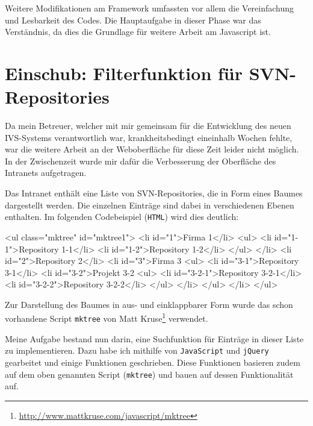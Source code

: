 \documentclass[xcolor=dvipsnames,11pt,paper=a4paper]{report}
\begin{document}
Weitere Modifikationen am Framework umfassten vor allem die Vereinfachung und Lesbarkeit
des Codes. Die Hauptaufgabe in dieser Phase war das Verständnis, da dies die Grundlage
für weitere Arbeit am Javascript ist.



\section{Einschub: Filterfunktion für SVN-Repositories}
\label{sec:svn}

Da mein Betreuer, welcher mit mir gemeinsam für die Entwicklung des neuen IVS-Systems
verantwortlich war, krankheitsbedingt eineinhalb Wochen fehlte, war die weitere
Arbeit an der Weboberfläche für diese Zeit leider nicht möglich. In der Zwischenzeit
wurde mir dafür die Verbesserung der Oberfläche des Intranets aufgetragen.

Das Intranet enthält eine Liste von SVN-Repositories, die in Form eines Baumes dargestellt
werden. Die einzelnen Einträge sind dabei in verschiedenen Ebenen enthalten. Im
folgenden Codebeispiel (\texttt{HTML}) wird dies deutlich:

\begin{code}[language=html, caption={Beispielcode zu den SVN-Repositories im Intranet}, label={lst:svn-html-beispiel}]
<ul class="mktree" id="mktree1">
	<li id="1">Firma 1</li>
		<ul>
			<li id="1-1">Repository 1-1</li>
			<li id="1-2">Repository 1-2</li>
		</ul>
	</li>
	<li id="2">Repository 2</li>
	<li id="3">Firma 3
		<ul>
			<li id="3-1">Repository 3-1</li>
			<li id="3-2">Projekt 3-2
				<ul>
					<li id="3-2-1">Repository 3-2-1</li>
					<li id="3-2-2">Repository 3-2-2</li>
				</ul>
			</li>
		</ul>
	</li>
</ul>
\end{code}

Zur Darstellung des Baumes in aus- und einklappbarer Form wurde das schon vorhandene
Script \texttt{mktree} von
Matt Kruse\footnote{\url{http://www.mattkruse.com/javascript/mktree}} verwendet.

Meine Aufgabe bestand nun darin, eine Suchfunktion für Einträge in dieser Liste
zu implementieren. Dazu habe ich mithilfe von \texttt{JavaScript} und \texttt{jQuery}
gearbeitet und einige Funktionen geschrieben. Diese Funktionen basieren zudem auf
dem oben genannten Script (\texttt{mktree}) und bauen auf dessen Funktionalität
auf.
\end{document}
